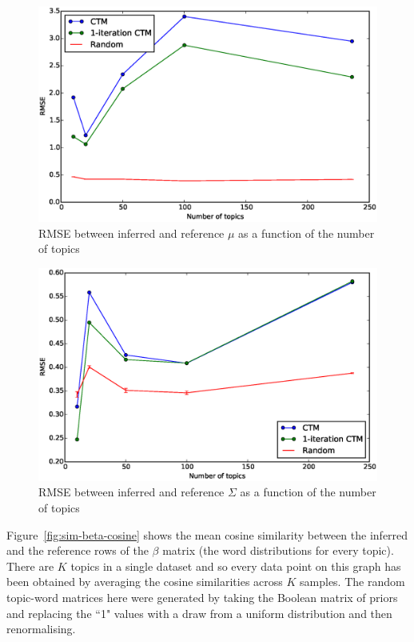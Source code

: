 \documentclass[12pt,a4paper,twoside,openright]{report}
\begin{document}
\begin{figure}[!htb]
\includegraphics[width=\textwidth]{sim-mu-rmse.eps}
\caption{RMSE between inferred and reference $\mu$ as a function of the number of topics}
\label{fig:sim-mu-rmse}
\end{figure}

\begin{figure}[!htb]
\includegraphics[width=\textwidth]{sim-sigma-rmse.eps}
\caption{RMSE between inferred and reference $\Sigma$ as a function of the number of topics}
\label{fig:sim-sigma-rmse}
\end{figure}

Figure~\ref{fig:sim-beta-cosine} shows the mean cosine similarity between the inferred and the reference rows of the $\beta$ matrix (the word distributions for every topic). There are $K$ topics in a single dataset and so every data point on this graph has been obtained by averaging the cosine similarities across $K$ samples. The random topic-word matrices here were generated by taking the Boolean matrix of priors and replacing the ``1" values with a draw from a uniform distribution and then renormalising.
\end{document}
